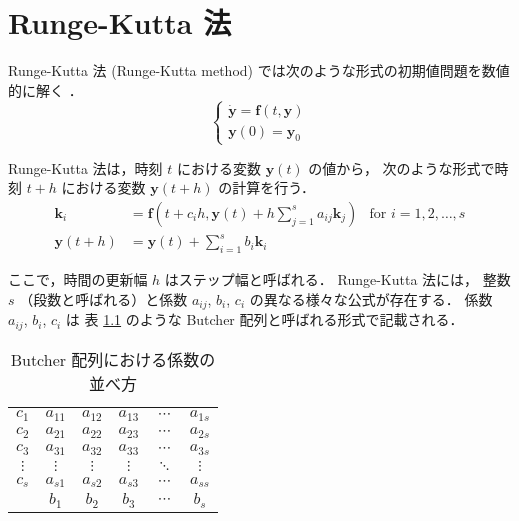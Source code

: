 %

\chapter{Runge-Kutta 法}

Runge-Kutta 法 (Runge-Kutta method) では次のような形式の初期値問題を数値的に解く
\cite{Mitsui1993}．
\begin{equation}
    \begin{cases}
        \dot{\bm{y}} = \bm{f}(t, \bm{y}) \\
        \bm{y}(0) = \bm{y}_0
    \end{cases}
\end{equation}

Runge-Kutta 法は，時刻 $t$ における変数 $\bm{y}(t)$ の値から，
次のような形式で時刻 $t + h$ における変数 $\bm{y}(t + h)$ の計算を行う．
\begin{align}
    \bm{k}_i      & = \bm{f}\left(t + c_i h, \bm{y}(t) + h \sum_{j = 1}^s a_{ij} \bm{k}_j \right)
                  & \text{for $i = 1, 2, \ldots, s$}
    \label{eq:ode_runge-kutta_k-law}                                                              \\
    \bm{y}(t + h) & = \bm{y}(t) + \sum_{i=1}^s b_i \bm{k}_i
    \label{eq:ode_runge-kutta_y-law}
\end{align}

ここで，時間の更新幅 $h$ はステップ幅と呼ばれる．
Runge-Kutta 法には，
整数 $s$ （段数と呼ばれる）と係数 $a_{ij}$, $b_i$, $c_i$ の異なる様々な公式が存在する．
係数 $a_{ij}$, $b_i$, $c_i$ は
表 \ref{table:ode_runge-kutta_butcher-array-general} のような
Butcher 配列と呼ばれる形式で記載される．

\begin{table}[tb]
    \caption{Butcher 配列における係数の並べ方}
    \label{table:ode_runge-kutta_butcher-array-general}
    \centering
    \begin{tabular}{c|ccccc}
        $c_1$    & $a_{11}$ & $a_{12}$ & $a_{13}$ & $\cdots$ & $a_{1s}$ \\
        $c_2$    & $a_{21}$ & $a_{22}$ & $a_{23}$ & $\cdots$ & $a_{2s}$ \\
        $c_3$    & $a_{31}$ & $a_{32}$ & $a_{33}$ & $\cdots$ & $a_{3s}$ \\
        $\vdots$ & $\vdots$ & $\vdots$ & $\vdots$ & $\ddots$ & $\vdots$ \\
        $c_s$    & $a_{s1}$ & $a_{s2}$ & $a_{s3}$ & $\cdots$ & $a_{ss}$ \\
        \hline
                 & $b_1$    & $b_2$    & $b_3$    & $\cdots$ & $b_s$
    \end{tabular}
\end{table}

